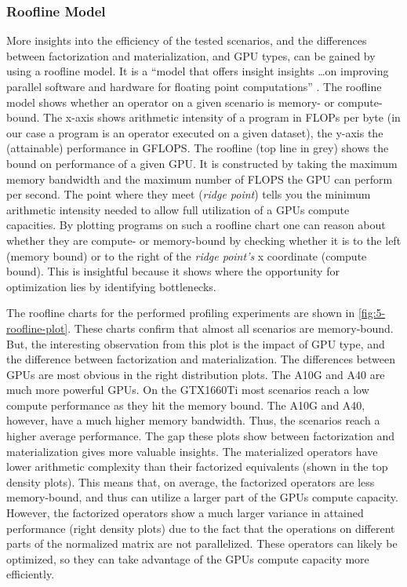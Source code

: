 \subsubsection*{Roofline Model}
More insights into the efficiency of the tested scenarios, and the differences between factorization and materialization, and GPU types, can be gained by using a roofline model. It is a “model that offers insight insights \ldots on improving parallel software and hardware for floating point computations” \cite{roofline}. The roofline model shows whether an operator on a given scenario is memory- or compute-bound. The x-axis shows arithmetic intensity of a program in FLOPs per byte (in our case a program is an operator executed on a given dataset), the y-axis the (attainable) performance in GFLOPS. The roofline (top line in grey) shows the bound on performance of a given GPU. It is constructed by taking the maximum memory bandwidth and the maximum number of FLOPS the GPU can perform per second. The point where they meet (\textit{ridge point}) tells you the minimum arithmetic intensity needed to allow full utilization of a GPUs compute capacities. By plotting programs on such a roofline chart one can reason about whether they are compute- or memory-bound by checking whether it is to the left (memory bound) or to the right of the \textit{ridge point's} x coordinate (compute bound). This is insightful because it shows where the opportunity for optimization lies by identifying bottlenecks.

The roofline charts for the performed profiling experiments are shown in \autoref{fig:5-roofline-plot}. These charts confirm that almost all scenarios are memory-bound. But, the interesting observation from this plot is the impact of GPU type, and the difference between factorization and materialization. The differences between GPUs are most obvious in the right distribution plots. The A10G and A40 are much more powerful GPUs. On the GTX1660Ti most scenarios reach a low compute performance as they hit the memory bound. The A10G and A40, however, have a much higher memory bandwidth. Thus, the scenarios reach a higher average performance. The gap these plots show between factorization and materialization gives more valuable insights. The materialized operators have lower arithmetic complexity than their factorized equivalents (shown in the top density plots). This means that, on average, the factorized operators are less memory-bound, and thus can utilize a larger part of the GPUs compute capacity. However, the factorized operators show a much larger variance in attained performance (right density plots) due to the fact that the operations on different parts of the normalized matrix are not parallelized. These operators can likely be optimized, so they can take advantage of the GPUs compute capacity more efficiently.

